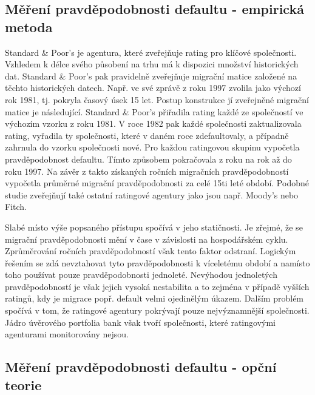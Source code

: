 \subsection{Měření pravděpodobnosti defaultu - empirická metoda}

Standard \& Poor's je agentura, které zveřejňuje rating pro klíčové společnosti. Vzhledem k délce svého působení na trhu má k dispozici množství historických dat. Standard \& Poor's pak pravidelně zveřejňuje migrační matice založené na těchto historických datech. Např. ve své zprávě z roku 1997 zvolila jako výchozí rok 1981, tj. pokryla časový úsek 15 let. Postup konstrukce jí zveřejněné migrační matice je následující. Standard \& Poor's přiřadila rating každé ze společností ve výchozím vzorku z roku 1981. V roce 1982 pak každé společnosti zaktualizovala rating, vyřadila ty společnosti, které v daném roce zdefaultovaly, a případně zahrnula do vzorku společnosti nové. Pro každou ratingovou skupinu vypočetla pravděpodobnost defaultu. Tímto způsobem pokračovala z roku na rok až do roku 1997. Na závěr z takto získaných ročních migračních pravděpodobností vypočetla průměrné migrační pravděpodobnosti za celé 15ti leté období. Podobné studie zveřejňují také ostatní ratingové agentury jako jsou např. Moody's nebo Fitch.

Slabé místo výše popsaného přístupu spočívá v jeho statičnosti. Je zřejmé, že se migrační pravděpodobnosti mění v čase v závislosti na hospodářském cyklu. Zprůměrování ročních pravděpodobností však tento faktor odstraní. Logickým řešením se zdá nevztahovat tyto pravděpodobnosti k víceletému období a namísto toho používat pouze pravděpodobnosti jednoleté. Nevýhodou jednoletých pravděpodobností je však jejich vysoká nestabilita a to zejména v případě vyšších ratingů, kdy je migrace popř. default velmi ojedinělým úkazem. Dalším problém spočívá v tom, že ratingové agentury pokrývají pouze nejvýznamnější společnosti. Jádro úvěrového portfolia bank však tvoří společnosti, které ratingovými agenturami monitorovány nejsou.

\subsection{Měření pravděpodobnosti defaultu - opční teorie}

